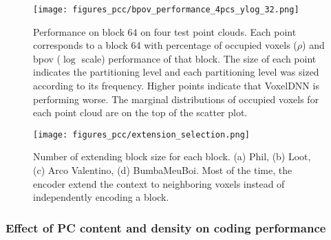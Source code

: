 \begin{figure*}[tb]
\captionsetup{justification=raggedright}
\centering
\texttt{[image: figures\_pcc/bpov\_performance\_4pcs\_ylog\_32.png]}
\caption{Performance on block 64 on four test point clouds. Each point corresponds to a block 64 with percentage of occupied voxels ($\rho$) and bpov ($\log$ scale) performance of that block. The size of each point indicates the partitioning level and each partitioning level was sized according to its frequency. Higher points indicate that VoxelDNN is performing worse. The marginal distributions of occupied voxels for each point cloud are on the top of the scatter plot. }
\label{fig:bpovperformace}
\end{figure*}
%
\begin{figure}[tb]
\captionsetup{justification=raggedright}
\centering
\texttt{[image: figures\_pcc/extension\_selection.png]}
\caption{Number of extending block size for each block. (a) Phil, (b) Loot, (c) Arco Valentino, (d) BumbaMeuBoi. Most of the time, the encoder extend the context to neighboring voxels instead of independently encoding a block. }
\label{fig:extendingblocksize}
\end{figure}
\setlength{\textfloatsep}{20pt}





\subsubsection{Effect of PC content and density on coding performance} 


